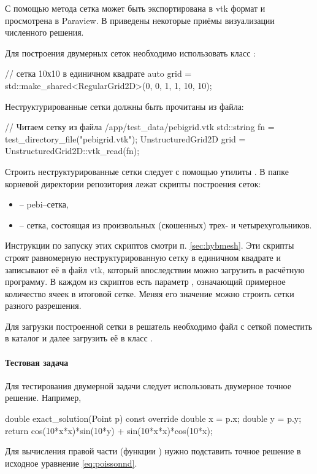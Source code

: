 С помощью метода  сетка может быть экспортирована в vtk формат и просмотрена в Paraview.
В  приведены некоторые приёмы визуализации численного решения.

Для построения двумерных сеток необходимо использовать класс :
\begin{cppcode}
// сетка 10х10 в единичном квадрате
auto grid = std::make_shared<RegularGrid2D>(0, 0, 1, 1, 10, 10);
\end{cppcode}

Неструктурированные сетки должны быть прочитаны из файла:

\begin{cppcode}
// Читаем сетку из файла /app/test_data/pebigrid.vtk
std::string fn = test_directory_file("pebigrid.vtk");
UnstructuredGrid2D grid = UnstructuredGrid2D::vtk_read(fn);
\end{cppcode}

Строить неструктурированные сетки следует с помощью утилиты .
В папке  корневой директории репозитория лежат скрипты построения сеток:
\begin{itemize}
\item {} -- pebi--сетка,
\item {} -- сетка, состоящая из произвольных (скошенных) трех- и четырехугольников.
\end{itemize}
Инструкции по запуску этих скриптов смотри п. \ref{sec:hybmesh}.
Эти скрипты строят равномерную неструктурированную сетку
в единичном квадрате
и записывают её в файл vtk, который впоследствии можно загрузить
в расчётную программу.
В каждом из скриптов есть параметр , означающий
примерное количество ячеек в итоговой сетке.
Меняя его значение можно строить сетки разного разрешения.

Для загрузки построенной сетки в решатель необходимо файл
с сеткой поместить в каталог 
и далее загрузить её в класс .

\paragraph{Тестовая задача}
Для тестирования двумерной задачи следует использовать двумерное точное решение.
Например,
\begin{cppcode}
double exact_solution(Point p) const override{
    double x = p.x;
    double y = p.y;
    return cos(10*x*x)*sin(10*y) + sin(10*x*x)*cos(10*x);
}
\end{cppcode}
Для вычисления правой части (функции )
нужно подставить точное решение в исходное уравнение \cref{eq:poissonnd}.


